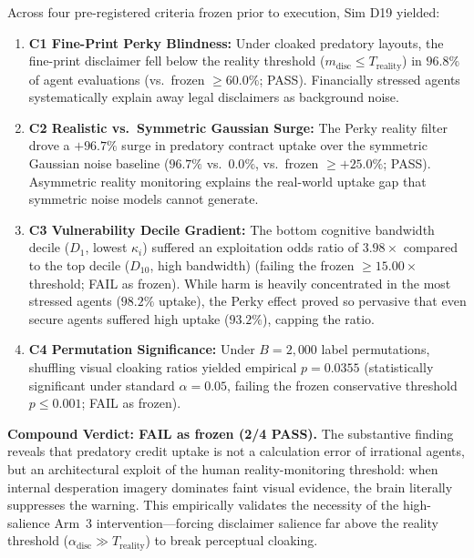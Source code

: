 \documentclass[11pt,twocolumn]{article}
\theoremstyle{plain}
\begin{document}
Across four pre-registered criteria frozen prior to execution, Sim D19 yielded:
\begin{enumerate}
\item \textbf{C1 Fine-Print Perky Blindness:} Under cloaked predatory layouts, the fine-print disclaimer fell below the reality threshold ($m_{\text{disc}} \le T_{\text{reality}}$) in $96.8\%$ of agent evaluations (vs.\ frozen $\ge 60.0\%$; PASS). Financially stressed agents systematically explain away legal disclaimers as background noise.
\item \textbf{C2 Realistic vs.\ Symmetric Gaussian Surge:} The Perky reality filter drove a $+96.7\%$ surge in predatory contract uptake over the symmetric Gaussian noise baseline ($96.7\%$ vs.\ $0.0\%$, vs.\ frozen $\ge +25.0\%$; PASS). Asymmetric reality monitoring explains the real-world uptake gap that symmetric noise models cannot generate.
\item \textbf{C3 Vulnerability Decile Gradient:} The bottom cognitive bandwidth decile ($D_1$, lowest $\kappa_i$) suffered an exploitation odds ratio of $3.98\times$ compared to the top decile ($D_{10}$, high bandwidth) (failing the frozen $\ge 15.00\times$ threshold; FAIL as frozen). While harm is heavily concentrated in the most stressed agents ($98.2\%$ uptake), the Perky effect proved so pervasive that even secure agents suffered high uptake ($93.2\%$), capping the ratio.
\item \textbf{C4 Permutation Significance:} Under $B = 2{,}000$ label permutations, shuffling visual cloaking ratios yielded empirical $p = 0.0355$ (statistically significant under standard $\alpha = 0.05$, failing the frozen conservative threshold $p \le 0.001$; FAIL as frozen).
\end{enumerate}

\textbf{Compound Verdict: FAIL as frozen (2/4 PASS).} The substantive finding reveals that predatory credit uptake is not a calculation error of irrational agents, but an architectural exploit of the human reality-monitoring threshold: when internal desperation imagery dominates faint visual evidence, the brain literally suppresses the warning. This empirically validates the necessity of the high-salience Arm~3 intervention---forcing disclaimer salience far above the reality threshold ($\alpha_{\text{disc}} \gg T_{\text{reality}}$) to break perceptual cloaking.
\end{document}
